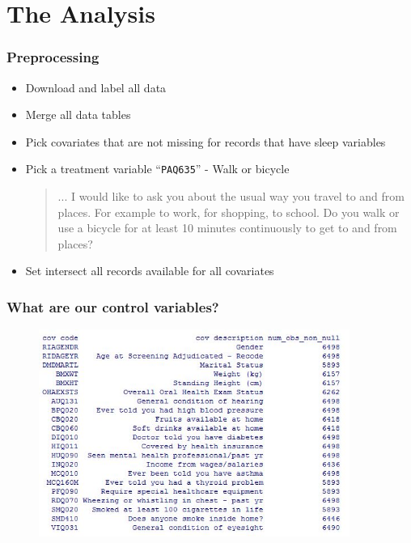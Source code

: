 \documentclass[presentation]{beamer}
\begin{document}
\section{The Analysis}

\begin{frame}
	\frametitle{Preprocessing}

\begin{itemize}
\item Download and label all data
\item Merge all data tables  \pause
\item Pick covariates that are not missing for records that have sleep variables \pause
\item Pick a treatment variable ``\texttt{PAQ635}'' \pause  - Walk or bicycle

\begin{quotation}
... I would like to ask you about the usual way you travel to and from places. For example to work, for shopping, to school. Do you walk or use a bicycle for at least 10 minutes continuously to get to and from places?
\end{quotation}  \pause

\item Set intersect all records available for all covariates
\end{itemize}

\end{frame}

\begin{frame}
	\frametitle{What are our control variables?}

\begin{figure}[htp]
\centering
\includegraphics[width=4in]{covariates.jpg}
\end{figure}
\FloatBarrier

\end{frame}
\end{document}
